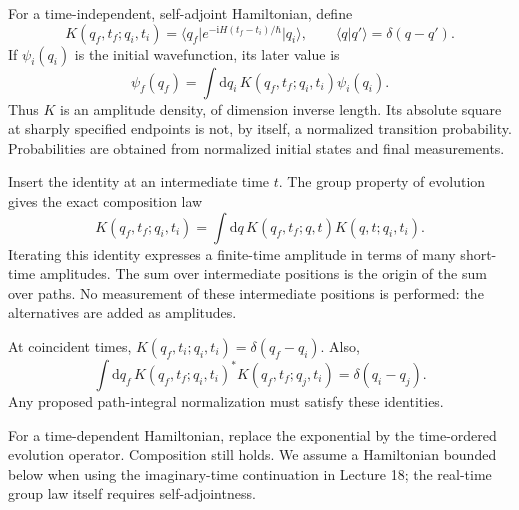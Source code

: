 \documentclass[11pt]{article}
\newcommand{\dd}{\mathrm d}
\newcommand{\ii}{\mathrm i}
\newcommand{\ket}[1]{\lvert#1\rangle}
\newcommand{\bra}[1]{\langle#1\rvert}
\begin{document}
For a time-independent, self-adjoint Hamiltonian, define
\begin{equation}
 K(q_f,t_f;q_i,t_i)=\bra{q_f}e^{-\ii H(t_f-t_i)/\hbar}\ket{q_i},
 \qquad \langle q|q'\rangle=\delta(q-q').                 \label{eq:kernel}
\end{equation}
If \(\psi_i(q_i)\) is the initial wavefunction, its later value is
\begin{equation}
 \psi_f(q_f)=\int\dd q_i\,K(q_f,t_f;q_i,t_i)\psi_i(q_i).
\end{equation}
Thus \(K\) is an amplitude density, of dimension inverse length. Its
absolute square at sharply specified endpoints is not, by itself, a
normalized transition probability. Probabilities are obtained from
normalized initial states and final measurements.

Insert the identity at an intermediate time \(t\). The group property
of evolution gives the exact composition law
\begin{equation}
 K(q_f,t_f;q_i,t_i)=\int\dd q\,
 K(q_f,t_f;q,t)K(q,t;q_i,t_i).                       \label{eq:composition}
\end{equation}
Iterating this identity expresses a finite-time amplitude in terms of
many short-time amplitudes. The sum over intermediate positions is the
origin of the sum over paths. No measurement of these intermediate
positions is performed: the alternatives are added as amplitudes.

\begin{keyidea}
At coincident times, \(K(q_f,t_i;q_i,t_i)=\delta(q_f-q_i)\). Also,
\[
 \int\dd q_f\,K(q_f,t_f;q_i,t_i)^*K(q_f,t_f;q_j,t_i)
 =\delta(q_i-q_j).
\]
Any proposed path-integral normalization must satisfy these identities.
\end{keyidea}

For a time-dependent Hamiltonian, replace the exponential by the
time-ordered evolution operator. Composition still holds. We assume a
Hamiltonian bounded below when using the imaginary-time continuation
in Lecture 18; the real-time group law itself requires self-adjointness.
\end{document}
